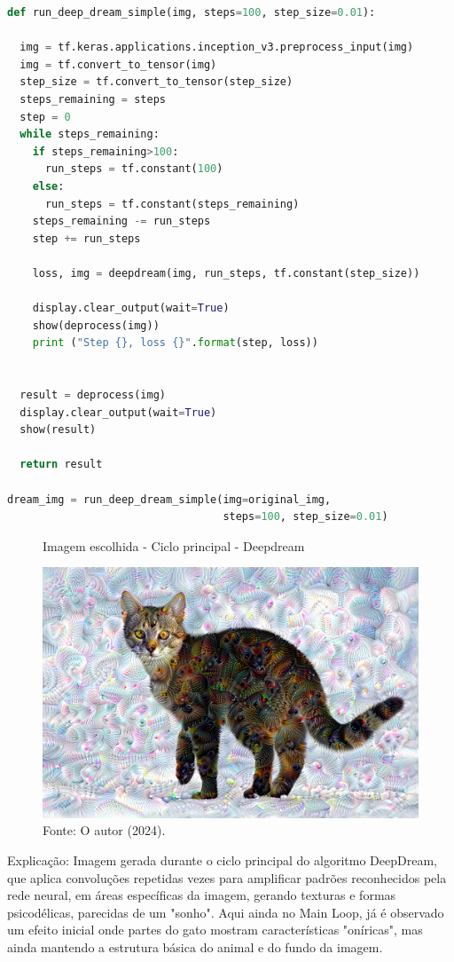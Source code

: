 \begin{lstlisting}[language=Python, style=input]
def run_deep_dream_simple(img, steps=100, step_size=0.01):

  img = tf.keras.applications.inception_v3.preprocess_input(img)
  img = tf.convert_to_tensor(img)
  step_size = tf.convert_to_tensor(step_size)
  steps_remaining = steps
  step = 0
  while steps_remaining:
    if steps_remaining>100:
      run_steps = tf.constant(100)
    else:
      run_steps = tf.constant(steps_remaining)
    steps_remaining -= run_steps
    step += run_steps

    loss, img = deepdream(img, run_steps, tf.constant(step_size))

    display.clear_output(wait=True)
    show(deprocess(img))
    print ("Step {}, loss {}".format(step, loss))


  result = deprocess(img)
  display.clear_output(wait=True)
  show(result)

  return result

dream_img = run_deep_dream_simple(img=original_img,
                                  steps=100, step_size=0.01)
\end{lstlisting}
\begin{figure}[H]
\centering
\caption{Imagem escolhida - Ciclo principal - Deepdream}
\includegraphics[width=.8\linewidth]{apendices/fig/13_IAA012_12.png}
\caption*{Fonte: O autor (2024).}
\end{figure}
Explicação: Imagem gerada durante o ciclo principal do algoritmo DeepDream, que aplica convoluções repetidas vezes para amplificar padrões reconhecidos pela rede neural, em áreas específicas da imagem, gerando texturas e formas psicodélicas, parecidas de um "sonho". Aqui ainda no Main Loop, já é observado um efeito inicial onde partes do gato mostram características "oníricas", mas ainda mantendo a estrutura básica do animal e do fundo da imagem.
